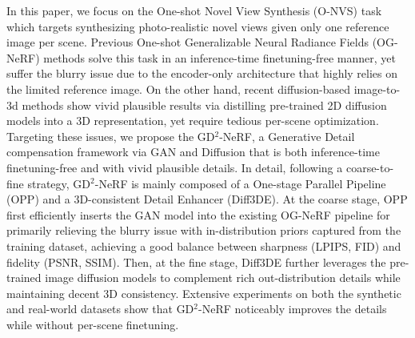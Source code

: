 In this paper, we focus on the One-shot Novel View Synthesis (O-NVS) task which targets synthesizing photo-realistic novel views given only one reference image per scene. Previous One-shot Generalizable Neural Radiance Fields (OG-NeRF) methods solve this task in an inference-time finetuning-free manner, yet suffer the blurry issue due to the encoder-only architecture that highly relies on the limited reference image. On the other hand, recent diffusion-based image-to-3d methods show vivid plausible results via distilling pre-trained 2D diffusion models into a 3D representation, yet require tedious per-scene optimization. Targeting these issues, we propose the GD$^2$-NeRF, a Generative Detail compensation framework via GAN and Diffusion that is both inference-time finetuning-free and with vivid plausible details. 
In detail, following a coarse-to-fine strategy, GD$^2$-NeRF is mainly composed of a One-stage Parallel Pipeline (OPP) and a 3D-consistent Detail Enhancer (Diff3DE). At the coarse stage, OPP first efficiently inserts the GAN model into the existing OG-NeRF pipeline for primarily relieving the blurry issue with in-distribution priors captured from the training dataset, achieving a good balance between sharpness  (LPIPS, FID) and fidelity (PSNR, SSIM). Then, at the fine stage, Diff3DE further leverages the pre-trained image diffusion models to complement rich out-distribution details while maintaining decent 3D consistency.
Extensive experiments on both the synthetic and real-world datasets show that GD$^2$-NeRF noticeably improves the details while without per-scene finetuning.
\vspace{-2mm}
